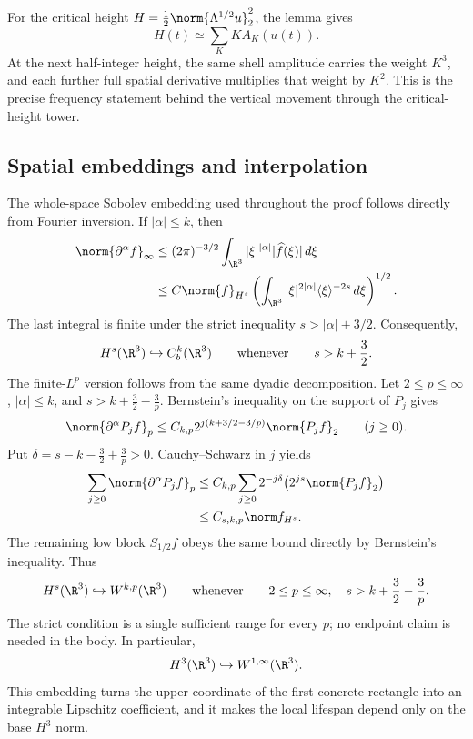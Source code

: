 For the critical height \(H=\frac12\norm{\Lambda^{1/2}u}_2^2\), the lemma gives
\[
 H(t)\simeq\sum_KK A_K(u(t)).
\]
At the next half-integer height, the same shell amplitude carries the weight \(K^3\), and each further full spatial derivative multiplies that weight by \(K^2\).
This is the precise frequency statement behind the vertical movement through the critical-height tower.

\subsection{Spatial embeddings and interpolation}

The whole-space Sobolev embedding used throughout the proof follows directly from Fourier inversion.
If \(|\alpha|\le k\), then
\begin{align*}
 \norm{\partial^\alpha f}_\infty
 &\le (2\pi)^{-3/2}\int_{\R^3}|\xi|^{|\alpha|}|\widehat f(\xi)|\,d\xi
 \\
 &\le C\norm{f}_{H^s}
 \left(\int_{\R^3}|\xi|^{2|\alpha|}\langle\xi\rangle^{-2s}\,d\xi\right)^{1/2}.
\end{align*}
The last integral is finite under the strict inequality \(s>|\alpha|+3/2\).
Consequently,
\begin{equation}
 H^s(\R^3)\hookrightarrow C_b^k(\R^3)
 \qquad\text{whenever}\qquad s>k+\frac32.
 \label{eq:appendix-spatial-embedding}
\end{equation}
The finite-\(L^p\) version follows from the same dyadic decomposition.  Let
\(2\le p\le\infty\), \(|\alpha|\le k\), and
\(s>k+\frac32-\frac3p\).  Bernstein's inequality on the support of \(P_j\)
gives
\[
 \norm{\partial^\alpha P_jf}_p
 \le C_{k,p}
 2^{j(k+3/2-3/p)}\norm{P_jf}_2
 \qquad(j\ge0).
\]
Put \(\delta=s-k-\frac32+\frac3p>0\).  Cauchy--Schwarz in \(j\) yields
\[
 \begin{aligned}
  \sum_{j\ge0}\norm{\partial^\alpha P_jf}_p
  &\le C_{k,p}
  \sum_{j\ge0}2^{-j\delta}
  \bigl(2^{js}\norm{P_jf}_2\bigr)\\
  &\le C_{s,k,p}\norm f_{H^s}.
 \end{aligned}
\]
The remaining low block \(S_{1/2}f\) obeys the same bound directly by
Bernstein's inequality.  Thus
\begin{equation}
 H^s(\R^3)\hookrightarrow W^{k,p}(\R^3)
 \qquad\text{whenever}\qquad
 2\le p\le\infty,
 \quad s>k+\frac32-\frac3p.
 \label{eq:appendix-Wkp-embedding}
\end{equation}
The strict condition is a single sufficient range for every \(p\); no endpoint
claim is needed in the body.
In particular,
\[
 H^3(\R^3)\hookrightarrow W^{1,\infty}(\R^3).
\]
This embedding turns the upper coordinate of the first concrete rectangle into an integrable Lipschitz coefficient, and it makes the local lifespan depend only on the base \(H^3\) norm.

